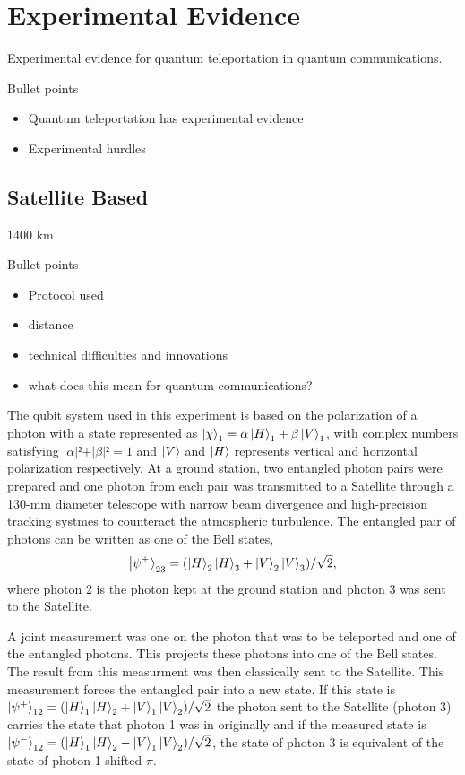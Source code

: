 \section{Experimental Evidence}
Experimental evidence for quantum teleportation in quantum communications.
\begin{mybox}{Bullet points}
    \begin{itemize}
        \item Quantum teleportation has experimental evidence
        \item Experimental hurdles
    \end{itemize}
\end{mybox}
\subsection{Satellite Based}

1400 km \cite{Ren:2017}
\begin{mybox}{Bullet points}
    \begin{itemize}
        \item Protocol used
        \item distance
        \item technical difficulties and innovations
        \item what does this mean for quantum communications?
    \end{itemize}
\end{mybox}

The qubit system used in this experiment is based on the polarization of a photon with a state represented as $\ket{\chi}_1 = \alpha\ket{H}_1 + \beta\ket{V}_1$, with complex numbers
satisfying $\vert\alpha\vert² + \vert\beta\vert² = 1$ and $\ket{V}$ and $\ket{H}$ represents vertical and horizontal polarization respectively.
 At a ground station, two entangled photon pairs were prepared and one photon from each pair was
transmitted to a Satellite through a 130-mm diameter telescope with narrow beam divergence and high-precision tracking systmes to counteract the atmospheric turbulence.
The entangled pair of photons can be written as one of the Bell states,
\begin{equation}
    \ket{\psi^{+}}_{23} = (\ket{H}_2\ket{H}_3 + \ket{V}_2\ket{V}_3)/\sqrt{2},
\end{equation}
where photon 2 is the photon kept at the ground station and photon 3 was sent to the Satellite.

A joint measurement was one on the photon that was to be teleported and one of the entangled photons. This projects these photons into one of the Bell states.
The result from this measurment was then classically sent to the Satellite. This measurement forces the entangled pair into a new state. If this state is 
$\ket{\psi^{+}}_{12} = (\ket{H}_1\ket{H}_2 + \ket{V}_1\ket{V}_2)/\sqrt{2}$ the photon sent to the Satellite (photon 3) carries the state that photon 1 was in originally
and if the measured state is $\ket{\psi^{-}}_{12} = (\ket{H}_1\ket{H}_2 - \ket{V}_1\ket{V}_2)/\sqrt{2}$, the state of photon 3 is equivalent of the state of photon 1 shifted $\pi$.

